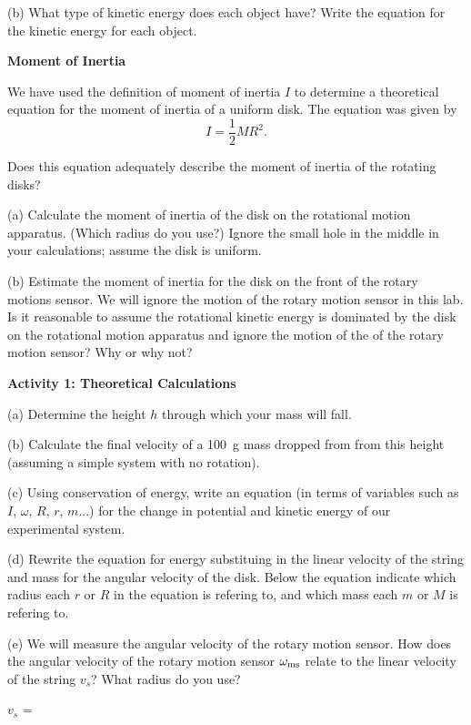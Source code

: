 (b) What type of kinetic energy does each object have? Write the equation for the kinetic energy for each object.
\answerspace{7mm}

\textbf{Moment of Inertia} 

We have used the definition of moment of inertia $I$ to determine a theoretical equation for the moment of inertia of a uniform disk.  The equation was given by
\[
I=\frac{1}{2}MR^{2}.\]

Does this equation adequately describe the moment of inertia of the rotating disks? 

\answerspace{3mm} 

(a) Calculate the moment of inertia of the disk on the rotational motion apparatus. (Which radius do you use?) Ignore the small hole in the middle in your calculations; assume the disk is uniform.
 \answerspace{15mm}
 
\pagebreak[2]
(b) Estimate the moment of inertia for the disk on the front of the rotary motions sensor. We will ignore the motion of the rotary motion sensor in this lab. Is it reasonable to assume the rotational kinetic energy is dominated by the disk on the rotational motion apparatus and ignore the motion of the of the rotary motion sensor? Why or why not?
 \answerspace{15mm}


\textbf{Activity 1: Theoretical Calculations}

(a) Determine the height $h$ through which your mass will fall.
\answerspace{5mm}

(b) Calculate the final velocity of a 100~g mass dropped from from this height (assuming a simple system with no rotation).
\answerspace{10mm} 

(c) Using conservation of energy, write an equation (in terms of variables such as $I$, $\omega$, $R$, $r$, $m$...) for the change in potential and kinetic energy of our experimental system.
\answerspace{10mm}

(d) Rewrite the equation for energy substituing in the linear velocity of the string and mass for the angular velocity of the disk. Below the equation indicate which radius each $r$ or $R$ in the equation is refering to, and which mass each $m$ or $M$ is refering to. 
\answerspace{20mm}


(e) We will measure the angular velocity of the rotary motion sensor. How does the angular velocity of the rotary motion sensor $\omega_{\rm ms}$ relate to the  
linear velocity of the string $v_{s}$? What radius do you use? 

\hspace{0.5in}$v_{s}$ =
\answerspace{5mm}

